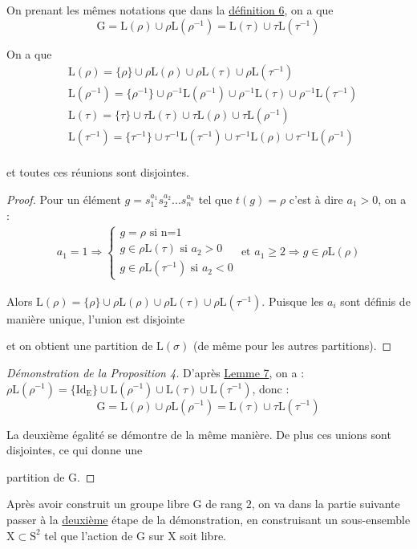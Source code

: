 \begin{prop}
  On prenant les mêmes notations que dans la \hyperref[6]{définition 6}, on a que
    $$\mathrm{G}=\mathrm{L}(\rho)\cup\rho\mathrm{L}(\rho^{-1})= \mathrm{L}(\tau)\cup\tau\mathrm{L}(\tau^{-1})$$
\end{prop}
\begin{lemma}\label{lemme9}
 On a que
  \begin{align*}
    &\mathrm{L}(\rho) = \{\rho\}\cup\rho\mathrm{L}(\rho)\cup\rho\mathrm{L}(\tau)\cup\rho\mathrm{L}(\tau^{-1})\\
    &\mathrm{L}(\rho^{-1}) = \{\rho^{-1}\}\cup\rho^{-1}\mathrm{L}(\rho^{-1})\cup\rho^{-1}\mathrm{L}(\tau)\cup\rho^{-1}\mathrm{L}(\tau^{-1})\\
    &\mathrm{L}(\tau) = \{\tau\}\cup\tau\mathrm{L}(\tau)\cup\tau\mathrm{L}(\rho)\cup\tau\mathrm{L}(\rho^{-1})\\
    &\mathrm{L}(\tau^{-1}) = \{\tau^{-1}\}\cup\tau^{-1}\mathrm{L}(\tau^{-1})\cup\tau^{-1}\mathrm{L}(\rho)\cup\tau^{-1}\mathrm{L}(\rho^{-1})\\
  \end{align*}
  \par
et toutes ces réunions sont disjointes.
\end{lemma}
\begin{proof}
  Pour un élément $g=s_1^{a_1}s_2^{a_2}...s_n^{a_n}$ tel que $t(g)=\rho$ c'est à dire $a_1>0$, on a :
  \begin{align*}
    a_1 =1 \Rightarrow \left\{
    \begin{array}{ll}
        g= \rho  \text{ si n=1}\\
        g \in \rho\mathrm{L}(\tau) \text{ si $a_2>0$}\\
        g \in \rho\mathrm{L}(\tau^{-1}) \text{ si $a_2<0$}
    \end{array}
     \right.
     \text{ et }
     a_1 \ge 2 \Rightarrow   g \in \rho\mathrm{L}(\rho)
   \end{align*}
   \par
   Alors $\mathrm{L}(\rho) = \{\rho\}\cup\rho\mathrm{L}(\rho)\cup\rho\mathrm{L}(\tau)\cup\rho\mathrm{L}(\tau^{-1})$. Puisque les $a_i$ sont définis de manière unique, l'union est disjointe \par et on obtient une partition de $\mathrm{L}(\sigma)$ (de même pour les autres partitions).
\end{proof}
\begin{proof}[Démonstration de la Proposition 4]
  \hfill

D'après \hyperref[lemme9]{Lemme 7}, on a :  $\rho\mathrm{L}(\rho^{-1}) = \{\mathrm{Id_E}\}\cup\mathrm{L}(\rho^{-1})\cup\mathrm{L}(\tau)\cup\mathrm{L}(\tau^{-1})$, donc :
$$\mathrm{G}=\mathrm{L}(\rho)\cup\rho\mathrm{L}(\rho^{-1})= \mathrm{L}(\tau)\cup\tau\mathrm{L}(\tau^{-1})$$\par
La deuxième égalité se démontre de la même manière. De plus ces unions sont disjointes, ce qui donne une\par partition de $\mathrm{G}$.
\end{proof}
\noindent
Après avoir construit un groupe libre $\mathrm{G}$ de rang $2$, on va dans la partie suivante passer à la \hyperref[2.]{deuxième} étape de la démonstration, en construisant un sous-ensemble $\mathrm{X} \subset \mathrm{S}^2$ tel que l'action de $\mathrm{G}$ sur $\mathrm{X}$ soit libre.
